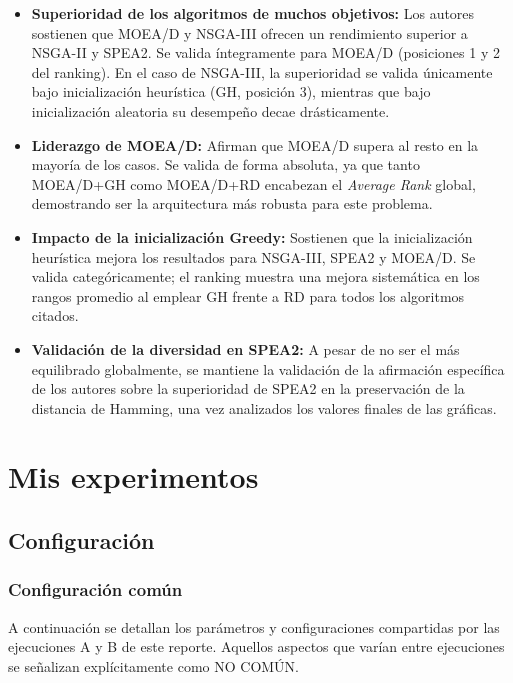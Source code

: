 \documentclass[a4paper,10pt]{article}
\begin{document}
\begin{itemize}
    \item \textbf{Superioridad de los algoritmos de muchos objetivos:} Los autores sostienen que MOEA/D y NSGA-III ofrecen un rendimiento superior a NSGA-II y SPEA2. Se valida íntegramente para MOEA/D (posiciones 1 y 2 del ranking). En el caso de NSGA-III, la superioridad se valida únicamente bajo inicialización heurística (GH, posición 3), mientras que bajo inicialización aleatoria su desempeño decae drásticamente.
    \item \textbf{Liderazgo de MOEA/D:} Afirman que MOEA/D supera al resto en la mayoría de los casos. Se valida de forma absoluta, ya que tanto MOEA/D+GH como MOEA/D+RD encabezan el \textit{Average Rank} global, demostrando ser la arquitectura más robusta para este problema.
    \item \textbf{Impacto de la inicialización Greedy:} Sostienen que la inicialización heurística mejora los resultados para NSGA-III, SPEA2 y MOEA/D. Se valida categóricamente; el ranking muestra una mejora sistemática en los rangos promedio al emplear GH frente a RD para todos los algoritmos citados.
    \item \textbf{Validación de la diversidad en SPEA2:} A pesar de no ser el más equilibrado globalmente, se mantiene la validación de la afirmación específica de los autores sobre la superioridad de SPEA2 en la preservación de la distancia de Hamming, una vez analizados los valores finales de las gráficas.
\end{itemize}


\section{Mis experimentos}
\label{sec:mis_experimentos}

\subsection{Configuración}

\subsubsection{Configuración común}
A continuación se detallan los parámetros y configuraciones compartidas por las ejecuciones A y B de este reporte. Aquellos aspectos que varían entre ejecuciones se señalizan explícitamente como \guillemotleft NO COMÚN\guillemotright.
\end{document}
